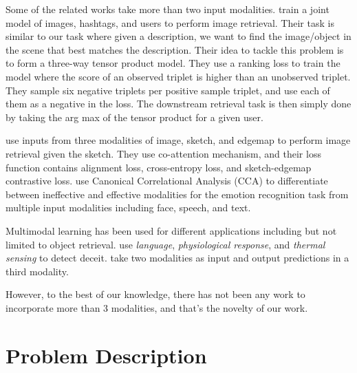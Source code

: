 \documentclass[11pt]{article}
\begin{document}
Some of the related works take more than two input modalities.
\citet{Veit_2018_CVPR} train a joint model of images, hashtags, and users to perform image retrieval. Their task is similar to our task where given a description, we want to find the image/object in the scene that best matches the description. Their idea to tackle this problem is to form a three-way tensor product model. They use a ranking loss to train the model where the score of an observed triplet is higher than an unobserved triplet. They sample six negative triplets per positive sample triplet, and use each of them as a negative in the loss.
The downstream retrieval task is then simply done by taking the arg max of the tensor product for a given user.


\citet{semihet_three_way_Lei_2020} use inputs from three modalities of image, sketch, and edgemap to perform image retrieval given the sketch. They use co-attention mechanism, and their loss function contains alignment loss, cross-entropy loss, and sketch-edgemap contrastive loss.
\citet{Mittal2020M3ER} use Canonical Correlational Analysis (CCA) to differentiate between ineffective and effective modalities for the emotion recognition task from multiple input modalities including face, speech, and text.

Multimodal learning has been used for different applications including but not limited to object retrieval. \citet{Deception_ICMI_2014} use \textit{language}, \textit{physiological response}, and \textit{thermal sensing} to detect deceit. \citet{het_data_fusion_liu_IEEE_2017} take two modalities as input and output predictions in a third modality.





However, to the best of our knowledge, there has not been any work to incorporate more than 3 modalities, and that's the novelty of our work.






\section{Problem Description}
\label{sec:Problem-Description}
\end{document}

